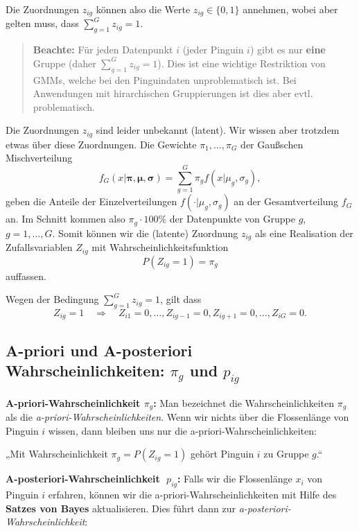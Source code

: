 \documentclass[
  ngerman,
]{book}
\begin{document}
Die Zuordnungen \(z_{ig}\) können also die Werte \(z_{ig}\in\{0,1\}\) annehmen, wobei aber gelten muss, dass \(\sum_{g=1}^Gz_{ig}=1\).

\begin{quote}
\textbf{Beachte:} Für jeden Datenpunkt \(i\) (jeder Pinguin \(i\)) gibt es nur \textbf{eine} Gruppe (daher \(\sum_{g=1}^Gz_{ig}=1\)). Dies ist eine wichtige Restriktion von GMMs, welche bei den Pinguindaten unproblematisch ist. Bei Anwendungen mit hirarchischen Gruppierungen ist dies aber evtl. problematisch.
\end{quote}

Die Zuordnungen \(z_{ig}\) sind leider unbekannt (latent). Wir wissen aber trotzdem etwas über diese Zuordnungen. Die Gewichte \(\pi_1,\dots,\pi_G\) der Gaußschen Mischverteilung
\[
f_G(x|\boldsymbol{\pi},\boldsymbol{\mu},\boldsymbol{\sigma})=\sum_{g=1}^G\pi_gf(x|\mu_g,\sigma_g),
\]
geben die Anteile der Einzelverteilungen \(f(\cdot|\mu_g,\sigma_g)\) an der Gesamtverteilung \(f_G\) an. Im Schnitt kommen also \(\pi_g\cdot 100\%\) der Datenpunkte von Gruppe \(g\), \(g=1,\dots,G\). Somit können wir die (latente) Zuordnung \(z_{ig}\) als eine Realisation der Zufallsvariablen \(Z_{ig}\) mit Wahrscheinlichkeitsfunktion
\[
P(Z_{ig}=1)=\pi_g
\]
auffassen.

Wegen der Bedingung \(\sum_{g=1}^Gz_{ig}=1\), gilt dass
\[
Z_{ig}=1\quad \Rightarrow\quad Z_{i1}=0,\dots,Z_{ig-1}=0,Z_{ig+1}=0,\dots,Z_{iG}=0.
\]

\hypertarget{a-priori-und-a-posteriori-wahrscheinlichkeiten-pi_g-und-p_ig}{%
\subsection{\texorpdfstring{A-priori und A-posteriori Wahrscheinlichkeiten: \(\pi_g\) und \(p_{ig}\)}{A-priori und A-posteriori Wahrscheinlichkeiten: \textbackslash pi\_g und p\_\{ig\}}}\label{a-priori-und-a-posteriori-wahrscheinlichkeiten-pi_g-und-p_ig}}

\textbf{A-priori-Wahrscheinlichkeit \(\pi_g\):} Man bezeichnet die Wahrscheinlichkeiten \(\pi_g\) als die \emph{a-priori-Wahrscheinlichkeiten}. Wenn wir nichts über die Flossenlänge von Pinguin \(i\) wissen, dann bleiben uns nur die a-priori-Wahrscheinlichkeiten:

„Mit Wahrscheinlichkeit \(\pi_g=P(Z_{ig}=1)\) gehört Pinguin \(i\) zu Gruppe \(g\).``

\textbf{A-posteriori-Wahrscheinlichkeit \(\;p_{ig}\):} Falls wir die Flossenlänge \(x_i\) von Pinguin \(i\) erfahren, können wir die a-priori-Wahrscheinlichkeiten mit Hilfe des \textbf{Satzes von Bayes} aktualisieren. Dies führt dann zur \emph{a-posteriori-Wahrscheinlichkeit}:
\end{document}
